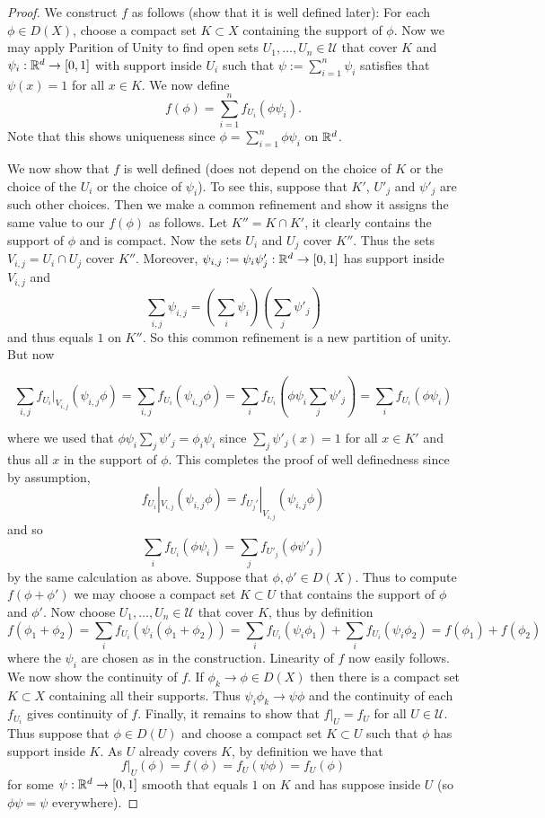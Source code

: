 \documentclass[twoside, a4paper, 10pt]{amsart}
\begin{document}
\begin{proof} We construct $f$ as follows (show that it is well defined later): For each $\phi \in D(X)$, choose a compact set $K \subset X$ containing the support of $\phi$. Now we may apply Parition of Unity to find open sets $U_1, \ldots, U_n \in \mathcal{U}$ that cover $K$ and $\psi_i:\mathbb{R}^d \to [0,1]$ with support inside $U_i$ such that $\psi := \sum_{i=1}^n \psi_i$ satisfies that $\psi(x) = 1$ for all $x \in K$. We now define $$f(\phi) = \sum_{i=1}^n f_{U_i}(\phi \psi_i).$$ Note that this shows uniqueness since $\phi = \sum_{i=1}^n \phi \psi_i$ on $\mathbb{R}^d$.

We now show that $f$ is well defined (does not depend on the choice of $K$ or the choice of the $U_i$ or the choice of $\psi_i$). To see this, suppose that $K'$, $U'_j$ and $\psi'_j$ are such other choices. Then we make a common refinement and show it assigns the same value to our $f(\phi)$ as follows. Let $K'' = K \cap K'$, it clearly contains the support of $\phi$ and is compact. Now the sets $U_i$ and $U_j$ cover $K''$. Thus the sets $V_{i,j} = U_i \cap U_j$ cover $K''$. Moreover, $\psi_{i,j}:=\psi_i \psi'_j:\mathbb{R}^d \to [0,1]$ has support inside $V_{i,j}$ and $$\sum_{i,j} \psi_{i,j} = \left(\sum_i \psi_i \right) \left( \sum_j \psi'_j \right)$$ and thus equals $1$ on $K''$. So this common refinement is a new partition of unity. But now 

$$\sum_{i,j} f_{U_i}|_{V_{i,j}}(\psi_{i,j}\phi) = \sum_{i,j} f_{U_i}(\psi_{i,j}\phi)  = \sum_i f_{U_i}(\phi\psi_{i}\sum_j \psi'_j) = \sum_i f_{U_i}(\phi \psi_i) $$ 

where we used that $\phi \psi_i \sum_j \psi'_j = \phi_i\psi_i$ since $\sum_j \psi'_j(x) = 1$ for all $x \in K'$ and thus all $x$ in the support of $\phi$. This completes the proof of well definedness since by assumption, $$f_{U_i}|_{V_{i,j}}(\psi_{i,j}\phi) = f_{U_j'}|_{V_{i,j}}(\psi_{i,j}\phi)$$ and so  $$\sum_i f_{U_i}(\phi \psi_i) = \sum_j f_{U'_j}(\phi \psi'_j)$$ by the same calculation as above. Suppose that $\phi, \phi' \in D(X)$. Thus to compute $f(\phi + \phi')$ we may choose a compact set $K \subset U$ that contains the support of $\phi$ and $\phi'$. Now choose $U_1, \ldots, U_n \in \mathcal{U}$ that cover $K$, thus by definition $$f(\phi_1 + \phi_2) = \sum_{i} f_{U_i} (\psi_i (\phi_1 + \phi_2)) = \sum_i f_{U_i}(\psi_i \phi_1) + \sum_i f_{U_i}(\psi_i \phi_2) = f(\phi_1) + f(\phi_2)$$ where the $\psi_i$ are chosen as in the construction. Linearity of $f$ now easily follows. We now show the continuity of $f$. If $\phi_k \to \phi \in D(X)$ then there is a compact set $K \subset X$ containing all their supports. Thus $\psi_i \phi_k \to \psi \phi$ and the continuity of each $f_{U_i}$ gives continuity of $f$. Finally, it remains to show that $f|_{U} = f_{U}$ for all $U \in \mathcal{U}$. Thus suppose that $\phi \in D(U)$ and choose a compact set $K \subset U$ such that $\phi$ has support inside $K$. As $U$ already covers $K$, by definition we have that $$f|_U(\phi) = f(\phi) =  f_U(\psi \phi) = f_U(\phi)$$ for some $\psi:\mathbb{R}^d \to [0,1]$ smooth that equals $1$ on $K$ and has suppose inside $U$ (so $\phi\psi = \psi$ everywhere). \end{proof}
\end{document}

